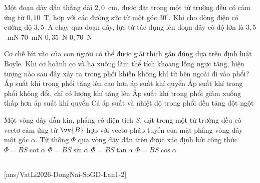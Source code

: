 	\begin{ex}%
		Một đoạn dây dẫn thẳng dài $2{,}0$~cm, được đặt trong một từ trường đều có cảm ứng từ $0{,}10$~T, hợp với các đường sức từ một góc $30^\circ$. Khi cho dòng điện có cường độ $3{,}5$~A chạy qua đoạn dây, lực từ tác dụng lên đoạn dây có độ lớn là
		\choice
		{\True $3{,}5$~mN}
		{$70$~mN}
		{$0{,}35$~N}
		{$0{,}70$~N}
	\end{ex}

	\begin{ex}%
		Cơ chế hít vào của con người có thể được giải thích gần đúng dựa trên định luật Boyle. Khi cơ hoành co và hạ xuống làm thể tích khoang lồng ngực tăng, hiện tượng nào sau đây xảy ra trong phổi khiến không khí từ bên ngoài đi vào phổi?
		\choice
		{Áp suất khí trong phổi tăng lên cao hơn áp suất khí quyển}
		{Áp suất khí trong phổi không đổi, chỉ có lượng khí tăng lên}
		{\True Áp suất khí trong phổi giảm xuống thấp hơn áp suất khí quyển}
		{Cả áp suất và nhiệt độ trong phổi đều tăng đột ngột}
	\end{ex}

	\begin{ex}%
		Một vòng dây dẫn kín, phẳng có diện tích $S$, đặt trong một từ trường đều có vectơ cảm ứng từ $\vv{B}$ hợp với vectơ pháp tuyến của mặt phẳng vòng dây một góc $\alpha$. Từ thông $\Phi$ qua vòng dây dẫn trên được xác định bởi công thức
		\choice
		{$\Phi=BS\cot\alpha$}
		{$\Phi=BS\sin\alpha$}
		{$\Phi=BS\tan\alpha$}
		{\True $\Phi=BS\cos\alpha$}
	\end{ex}

	\subsection*{}
	\setcounter{ex}{0}
	[ans/VatLi2026-DongNai-SoGD-Lan1-2]


